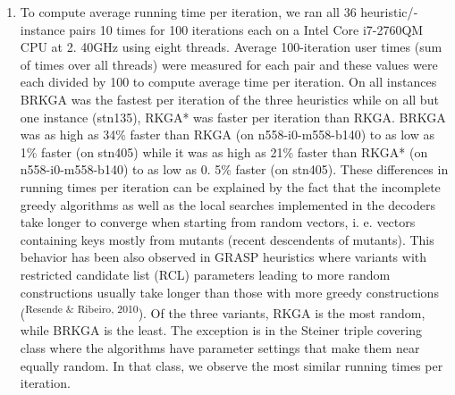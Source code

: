 \begin{multicols}{2}
\begin{enumerate}[label=\textbullet,leftmargin=*]
\item \par{}To compute average running time per iteration,\allowbreak{} we ran all 36 heuristic\fshyp{} instance pairs 10 times for 100 iterations each on a Intel Core i7-\allowbreak{}2760QM CPU at 2.\allowbreak{} 40GHz using eight threads.\allowbreak{} Average 100-\allowbreak{}iteration user times (\allowbreak{}sum of times over all threads)\allowbreak{} were measured for each pair and these values were each divided by 100 to compute average time per iteration.\allowbreak{} On all instances BRKGA was the fastest per iteration of the three heuristics while on all but one instance (\allowbreak{}stn135)\allowbreak{},\allowbreak{} RKGA*\allowbreak{} was faster per iteration than RKGA.\allowbreak{} BRKGA was as high as 34\%\allowbreak{\allowbreak{}\allowbreak{}}\allowbreak{} faster than RKGA (\allowbreak{}on n558-\allowbreak{}i0-\allowbreak{}m558-\allowbreak{}b140)\allowbreak{} to as low as 1\%\allowbreak{\allowbreak{}\allowbreak{}}\allowbreak{} faster (\allowbreak{}on stn405)\allowbreak{} while it was as high as 21\%\allowbreak{\allowbreak{}\allowbreak{}}\allowbreak{} faster than RKGA*\allowbreak{} (\allowbreak{}on n558-\allowbreak{}i0-\allowbreak{}m558-\allowbreak{}b140)\allowbreak{} to as low as 0.\allowbreak{} 5\%\allowbreak{\allowbreak{}\allowbreak{}}\allowbreak{} faster (\allowbreak{}on stn405)\allowbreak{}.\allowbreak{} These differences in running times per iteration can be explained by the fact that the incomplete greedy algorithms as well as the local searches implemented in the decoders take longer to converge when starting from random vectors,\allowbreak{} i.\allowbreak{} e.\allowbreak{} vectors containing keys mostly from mutants (\allowbreak{}recent descendents of mutants)\allowbreak{}.\allowbreak{} This behavior has been also observed in GRASP heuristics where variants with restricted candidate list (\allowbreak{}RCL)\allowbreak{} parameters leading to more random constructions usually take longer than those with more greedy constructions (\allowbreak{}\textsuperscript{Resende \&\allowbreak{\allowbreak{}\allowbreak{}}\allowbreak{} Ribeiro,\allowbreak{} 2010})\allowbreak{}.\allowbreak{} Of the three variants,\allowbreak{} RKGA is the most random,\allowbreak{} while BRKGA is the least.\allowbreak{} The exception is in the Steiner triple covering class where the algorithms have parameter settings that make them near equally random.\allowbreak{} In that class,\allowbreak{} we observe the most similar running times per iteration.\allowbreak{}

\end{enumerate}
\end{multicols}
